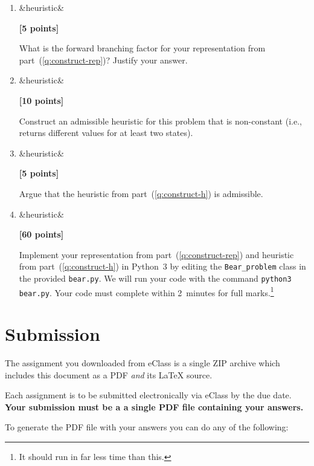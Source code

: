 \documentclass{article}
\newcounter{totalpoints}
\newcommand{\points}[2][]{{\addtocounter{totalpoints}{#2}\ifx&#1&\else\addtocounter{#1}{#2}\fi\textbf{[#2 points]}}}
\begin{document}
\begin{enumerate}
\begin{enumerate}
\item \points[heuristic]{5}
What is the forward branching factor for your representation from part~(\ref{q:construct-rep})?
Justify your answer.
\begin{answer}{2.5in}
\end{answer}

\item \points[heuristic]{10} \label{q:construct-h}
Construct an admissible heuristic for this problem that is non-constant (i.e., returns different values for at least two states).
\begin{answer}{2.5in}
\end{answer}


\item \points[heuristic]{5}
Argue that the heuristic from part~(\ref{q:construct-h}) is admissible.
\begin{answer}{2.5in}
\end{answer}


\item \points[heuristic]{60} \label{q:code}
Implement your representation from part~(\ref{q:construct-rep}) and heuristic from part~(\ref{q:construct-h}) in Python~3 by editing the \verb|Bear_problem| class in the provided \texttt{bear.py}.
We will run your code with the command \verb|python3 bear.py|.
Your code must complete within 2~minutes for full marks.\footnote{It should run in far less time than this.}

\end{enumerate}


\end{enumerate}


\clearpage
\section*{Submission}
The assignment you downloaded from eClass is a single ZIP archive which includes this document as a PDF {\em and} its \LaTeX{} source.

\medskip

Each assignment is to be submitted electronically via eClass by the due date.
\textbf{Your submission must be a a single PDF file containing your answers.} 

To generate the PDF file with your answers you can do any of the following:
\end{document}
